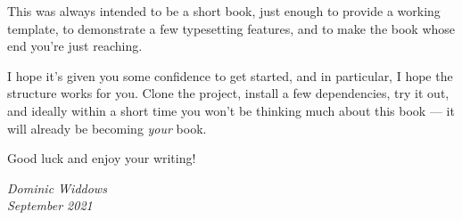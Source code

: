 This was always intended to be a short book, just enough to provide a working template, to demonstrate
a few typesetting features, and to make the book whose end you're just reaching.

I hope it's given you some confidence to get started, and in particular, I hope the structure works for you.
Clone the project, install a few dependencies, try it out, and ideally within a short time you won't be thinking
much about this book --- it will already be becoming {\em your} book.

Good luck and enjoy your writing!

\begin{flushright}
  {\em Dominic Widdows \\ September 2021}
\end{flushright}




